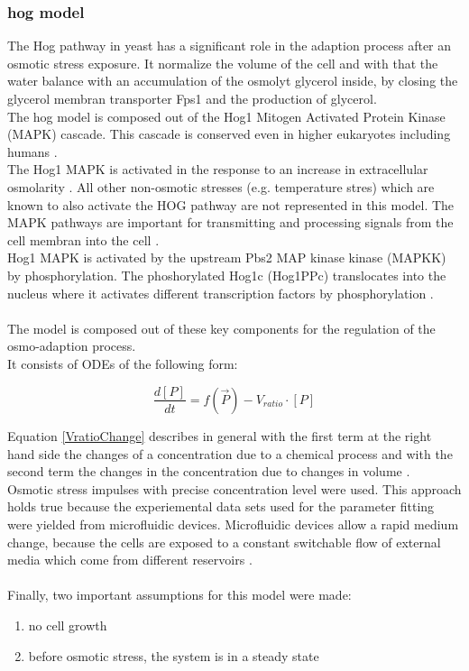 \subsubsection{hog model}
The Hog pathway in yeast has a significant role in the adaption process after an osmotic stress exposure. It normalize the volume of the cell and with that the water balance with an accumulation of the osmolyt glycerol inside, by closing the glycerol membran transporter Fps1 \cite{Saito2012} \cite{ASimpleMathematicalModel} and the production of glycerol.  \\
The hog model is composed out of the Hog1 Mitogen Activated Protein Kinase (MAPK) cascade. This cascade is conserved even in higher eukaryotes including humans \cite{ASimpleMathematicalModel}. \\ 
The Hog1 MAPK is activated in the response to an increase in extracellular osmolarity \cite{Saito2012}. All other non-osmotic stresses (e.g. temperature stres) which are known to also activate the HOG pathway \cite{Saito2012} are not represented in this model. The MAPK pathways are important for transmitting and processing signals from the cell membran into the cell \cite{ASimpleMathematicalModel}. \\
Hog1 MAPK is activated by the upstream Pbs2 MAP kinase kinase (MAPKK) by phosphorylation. The phoshorylated Hog1c (Hog1PPc) translocates into the nucleus where it activates different transcription factors by phosphorylation \cite{JannisUhlendorf} \cite{Zi_2010}.\\\\
The model is composed out of these key components for the regulation of the osmo-adaption process.\\
It consists of ODEs of the following form:

\begin{equation}\label{VratioChange}
\frac{d[P]}{dt} = f(\vec{P})-V_{ratio}\cdot [P]
\end{equation}

Equation \ref{VratioChange} describes in general  with the first term at the right hand side the changes of a concentration due to a chemical process and with the second term the changes in the concentration due to changes in volume \cite{Ke_2013}.\\
Osmotic stress impulses with precise concentration level were used. This approach holds true because the experiemental data sets used for the parameter fitting were yielded from microfluidic devices. Microfluidic devices allow a rapid medium change, because the cells are exposed to a constant switchable flow of external media which come from different reservoirs \cite{Zi_2010}. \\\\
Finally, two important assumptions for this model were made:
\begin{enumerate}
	\item no cell growth
	\item before osmotic stress, the system is in a steady state
\end{enumerate}


\newpage